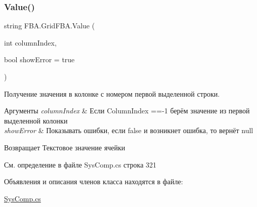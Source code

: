 \subsubsection{\texorpdfstring{Value()}{Value()}\hspace{0.1cm}{\footnotesize\ttfamily [4/4]}}
{\footnotesize\ttfamily string F\+B\+A.\+Grid\+F\+B\+A.\+Value (\begin{DoxyParamCaption}\item[{int}]{column\+Index,  }\item[{bool}]{show\+Error = {\ttfamily true} }\end{DoxyParamCaption})}



Получение значения в колонке с номером первой выделенной строки. 


\begin{DoxyParams}{Аргументы}
{\em column\+Index} & Если Column\+Index ==-\/1 берём значение из первой выделенной колонки\\
\hline
{\em show\+Error} & Показывать ошибки, если false и возникнет ошибка, то вернёт null\\
\hline
\end{DoxyParams}
\begin{DoxyReturn}{Возвращает}
Текстовое значение ячейки
\end{DoxyReturn}


См. определение в файле Sys\+Comp.\+cs строка 321



Объявления и описания членов класса находятся в файле\+:\begin{DoxyCompactItemize}
\item 
\mbox{\hyperlink{_sys_comp_8cs}{Sys\+Comp.\+cs}}\end{DoxyCompactItemize}
